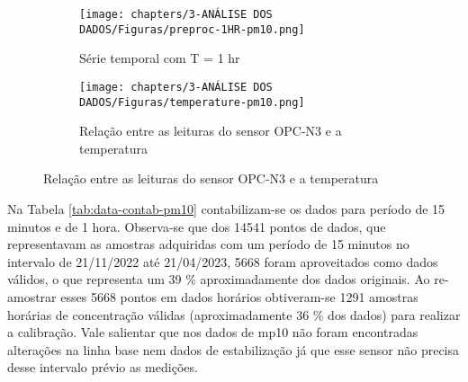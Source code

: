 \begin{figure}[h]
    \centering
    \caption{Série temporal horária das leituras do sensor OPC-N3 e sua relação com a temperatura}
    \begin{subfigure}{0.495\textwidth}
        \texttt{[image: chapters/3-ANÁLISE DOS DADOS/Figuras/preproc-1HR-pm10.png]}
        \caption{Série temporal com T = 1 hr}
        \label{fig:data-pm10-preproc-1HR}
    \end{subfigure}
    \hfill
    \begin{subfigure}{0.495\textwidth}
        \texttt{[image: chapters/3-ANÁLISE DOS DADOS/Figuras/temperature-pm10.png]}
        \caption{Relação entre as leituras do sensor OPC-N3 e a temperatura}
        \label{fig:data-temp-pm10-corr}
    \end{subfigure}
\end{figure}

Na Tabela \ref{tab:data-contab-pm10} contabilizam-se os dados para período de 15 minutos e de 1 hora. Observa-se que dos 14541 pontos de dados, que representavam as amostras adquiridas com um período de 15 minutos no intervalo de 21/11/2022 até 21/04/2023, 5668 foram aproveitados como dados válidos, o que representa um 39 \% aproximadamente dos dados originais. Ao re-amostrar esses 5668 pontos em dados horários obtiveram-se 1291 amostras horárias de concentração válidas (aproximadamente 36 \% dos dados) para realizar a calibração. Vale salientar que nos dados de \acrshort{mp10} não foram encontradas alterações na linha base nem dados de estabilização já que esse sensor não precisa desse intervalo prévio as medições.

